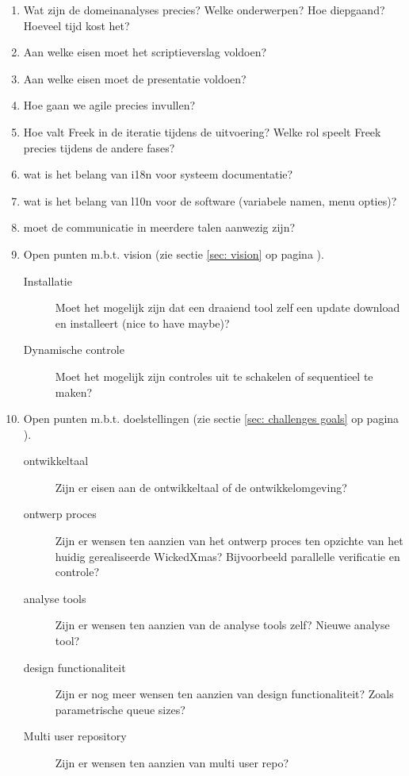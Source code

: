 \documentclass[a4paper,11pt]{article}
\begin{document}
\begin{enumerate}
 \item Wat zijn de domeinanalyses precies? Welke onderwerpen? Hoe diepgaand? Hoeveel tijd kost het?
 \item Aan welke eisen moet het scriptieverslag voldoen?
 \item Aan welke eisen moet de presentatie voldoen?
 \item Hoe gaan we agile precies invullen?
 \item Hoe valt Freek in de iteratie tijdens de uitvoering? Welke rol speelt Freek precies tijdens de andere fases?
 \item wat is het belang van i18n voor systeem documentatie?
 \item wat is het belang van l10n voor de software (variabele namen, menu opties)?
 \item moet de communicatie in meerdere talen aanwezig zijn?

 \item Open punten m.b.t. vision (zie sectie \ref{sec: vision} op pagina \pageref{sec: vision}).
 \begin{description}
  \item[Installatie] Moet het mogelijk zijn dat een draaiend tool zelf een update download en installeert (nice to have maybe)?
  \item[Dynamische controle] Moet het mogelijk zijn controles uit te schakelen of sequentieel te maken?
 \end{description}

 \item Open punten m.b.t. doelstellingen (zie sectie \ref{sec: challenges goals} op pagina \pageref{sec: challenges goals}).
 \begin{description}
    \item[ontwikkeltaal] Zijn er eisen aan de ontwikkeltaal of de ontwikkelomgeving?
    \item[ontwerp proces] Zijn er wensen ten aanzien van het ontwerp proces ten opzichte van het
	huidig gerealiseerde WickedXmas? Bijvoorbeeld parallelle verificatie en controle?
    \item[analyse tools] Zijn er wensen ten aanzien van de analyse tools zelf? Nieuwe analyse tool?
    \item[design functionaliteit] Zijn er nog meer wensen ten aanzien van design functionaliteit? Zoals parametrische queue sizes?
    \item[Multi user repository] Zijn er wensen ten aanzien van multi user repo?
 \end{description}
\end{enumerate}
\end{document}
